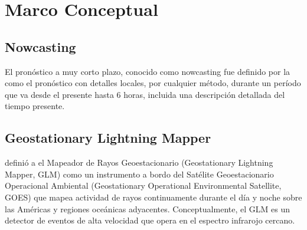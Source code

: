 \section{Marco Conceptual}

\subsection{Nowcasting}
El pronóstico a muy corto plazo, conocido como nowcasting fue definido por la
\cite{wmo2017} como el pronóstico con detalles locales, por cualquier método, 
durante un período que va desde el presente hasta 6 horas, incluida una 
descripción detallada del tiempo presente.


\subsection{Geostationary Lightning Mapper}
\cite{GOODMAN201334} definió a el Mapeador de Rayos Geoestacionario 
(Geostationary Lightning Mapper, GLM) como un instrumento a bordo del Satélite 
Geoestacionario Operacional Ambiental (Geostationary Operational Environmental 
Satellite, GOES) que mapea actividad de rayos continuamente durante el día y 
noche sobre las Américas y regiones oceánicas adyacentes. Conceptualmente, el 
GLM es un detector de eventos de alta velocidad que opera en el espectro 
infrarojo cercano.

